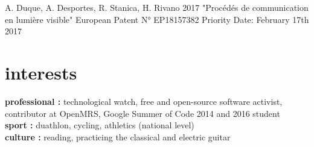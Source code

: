\documentclass[]{cv-style}          %
\begin{document}
\normalsize
\begin{publist}
\pat
{A. Duque, A. Desportes,  R. Stanica, H. Rivano}
{2017}
{"Procédés de communication en lumière visible"}
{European Patent N° EP18157382}
{Priority Date: February 17th 2017}
\\
\end{publist}







\section{interests}
  \vspace{-0.2cm}

\textbf{professional :} technological watch,  free and open-source software activist, contributor at OpenMRS, Google Summer of Code 2014 and 2016 student\\
\textbf{sport :} duathlon, cycling, athletics (national level) \\
\textbf{culture :} reading, practicing the classical and electric guitar
\end{document}
